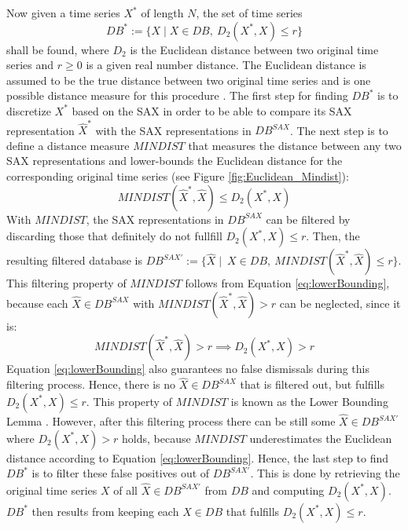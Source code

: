 Now given a time series $X^*$ of length $N$, the set of time series 
\begin{equation*}
DB^* := \{X \mid X \in DB, \ D_2(X^*, X) \leq r\}
\end{equation*}
shall be found, where $D_2$ is the Euclidean distance between two original time series and $r \geq 0$ is a given real number distance. The Euclidean distance is assumed to be the true distance between two original time series and is one possible distance measure for this procedure \cite{Survey_Esling}. \newline
The first step for finding $DB^*$ is to discretize $X^*$ based on the \ac{SAX} in order to be able to compare its \ac{SAX} representation $\hat{X}^*$ with the \ac{SAX} representations in $DB^{SAX}$. \newline
The next step is to define a distance measure $MINDIST$ that measures the distance between any two \ac{SAX} representations and lower-bounds the Euclidean distance for the corresponding original time series (see Figure \ref{fig:Euclidean_Mindist}):
\begin{equation}
MINDIST(\hat{X}^*,\hat{X}) \leq D_2(X^*,X)
\label{eq:lowerBounding}
\end{equation}
With $MINDIST$, the \ac{SAX} representations in $DB^{SAX}$ can be filtered by discarding those that definitely do not fullfill $D_2(X^*,X) \leq r$. Then, the resulting filtered database is $DB^{SAX'} := \{\hat{X} \mid \ X \in DB, \ MINDIST(\hat{X}^*,\hat{X}) \leq r\}$. This filtering property of $MINDIST$ follows from Equation \ref{eq:lowerBounding}, because each $\hat{X} \in DB^{SAX}$ with $MINDIST(\hat{X}^*,\hat{X}) > r$ can be neglected, since it is:
\begin{equation}
MINDIST(\hat{X}^*,\hat{X}) > r \implies D_2(X^*,X) > r
\end{equation}
Equation \ref{eq:lowerBounding} also guarantees no false dismissals during this filtering process. Hence, there is no $\hat{X} \in DB^{SAX}$ that is filtered out, but fulfills $D_2(X^*,X) \leq r$. This property of $MINDIST$ is known as the Lower Bounding Lemma \cite{Faloutsos_Bounding_Lemma}. \newline
However, after this filtering process there can be still some $\hat{X} \in DB^{SAX'}$ where $D_2(X^*,X) > r$ holds, because $MINDIST$ underestimates the Euclidean distance according to Equation \ref{eq:lowerBounding}. \newline
Hence, the last step to find $DB^*$ is to filter these false positives out of $DB^{SAX'}$. This is done by retrieving the original time series $X$  of all $\hat{X} \in DB^{SAX'}$ from $DB$ and computing $D_2(X^*,X)$. $DB^*$ then results from keeping each $X \in DB$ that fulfills $D_2(X^*,X) \leq r$. \newline
